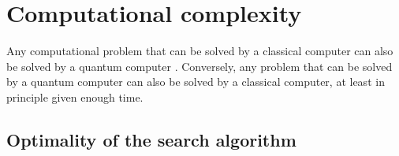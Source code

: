 \section{Computational complexity}
Any computational problem that can be solved by a classical computer can also be solved by a quantum computer \cite[29]{NielsenChuang}. Conversely, any problem that can be solved by a quantum computer can also be solved by a classical computer, at least in principle given enough time.
\subsection{Optimality of the search algorithm}